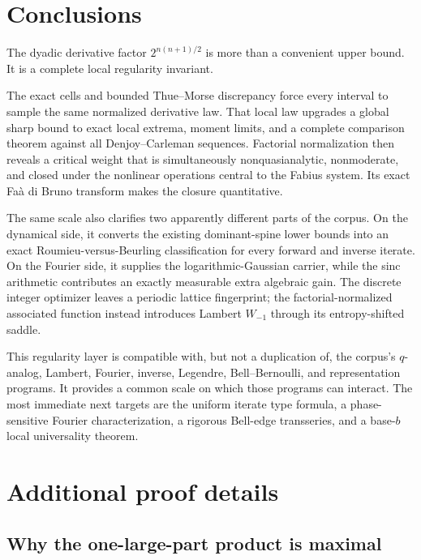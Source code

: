 \documentclass[11pt,a4paper]{article}
\theoremstyle{definition}
\theoremstyle{remark}
\begin{document}
\section{Conclusions}
\label{sec:conclusion}

The dyadic derivative factor $2^{n(n+1)/2}$ is more than a convenient upper bound.
It is a complete local regularity invariant.

The exact cells and bounded Thue--Morse discrepancy force every interval to sample
the same normalized derivative law.  That local law upgrades a global sharp bound
to exact local extrema, moment limits, and a complete comparison theorem against
all Denjoy--Carleman sequences.  Factorial normalization then reveals a critical
weight that is simultaneously nonquasianalytic, nonmoderate, and closed under the
nonlinear operations central to the Fabius system.  Its exact Fa\`a di Bruno
transform makes the closure quantitative.

The same scale also clarifies two apparently different parts of the corpus.  On the
dynamical side, it converts the existing dominant-spine lower bounds into an exact
Roumieu-versus-Beurling classification for every forward and inverse iterate.  On
the Fourier side, it supplies the logarithmic-Gaussian carrier, while the sinc
arithmetic contributes an exactly measurable extra algebraic gain.  The discrete
integer optimizer leaves a periodic lattice fingerprint; the factorial-normalized
associated function instead introduces Lambert $W_{-1}$ through its entropy-shifted
saddle.

This regularity layer is compatible with, but not a duplication of, the corpus's
$q$-analog, Lambert, Fourier, inverse, Legendre, Bell--Bernoulli, and representation
programs.  It provides a common scale on which those programs can interact.  The
most immediate next targets are the uniform iterate type formula, a phase-sensitive
Fourier characterization, a rigorous Bell-edge transseries, and a base-$b$ local
universality theorem.

\appendix

\section{Additional proof details}
\label{app:details}

\subsection{Why the one-large-part product is maximal}
\end{document}
